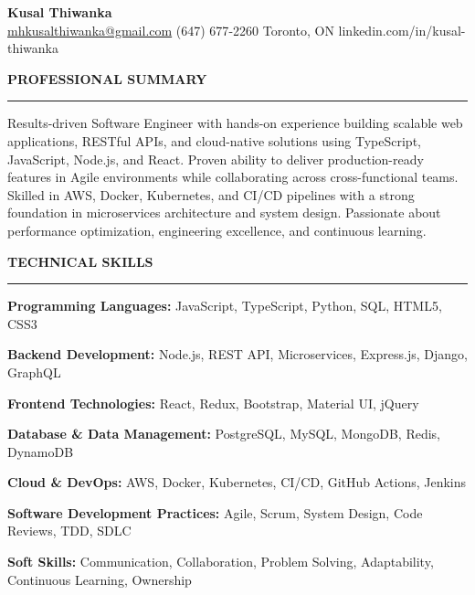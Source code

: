 \documentclass[10pt,letterpaper]{article}
\begin{document}
\begin{center}
{\LARGE\textbf{Kusal Thiwanka}}\\[3pt]
\href{mailto:mhkusalthiwanka@gmail.com}{mhkusalthiwanka@gmail.com}\hspace{2em}%
(647) 677{-}2260\hspace{2em}%
Toronto, ON\hspace{2em}
linkedin.com/in/kusal-thiwanka
\end{center}

\vspace{6pt}

\textbf{PROFESSIONAL SUMMARY}\\[-8pt]
\noindent\rule{\textwidth}{1pt}

\vspace{-2pt}

Results-driven Software Engineer with hands-on experience building scalable web applications, RESTful APIs, and cloud-native solutions using TypeScript, JavaScript, Node.js, and React. Proven ability to deliver production-ready features in Agile environments while collaborating across cross-functional teams. Skilled in AWS, Docker, Kubernetes, and CI/CD pipelines with a strong foundation in microservices architecture and system design. Passionate about performance optimization, engineering excellence, and continuous learning.

\vspace{8pt}

\textbf{TECHNICAL SKILLS}\\[-8pt]
\noindent\rule{\textwidth}{1pt}

\vspace{-2pt}

\textbf{Programming Languages:} JavaScript, TypeScript, Python, SQL, HTML5, CSS3

\textbf{Backend Development:} Node.js, REST API, Microservices, Express.js, Django, GraphQL

\textbf{Frontend Technologies:} React, Redux, Bootstrap, Material UI, jQuery

\textbf{Database \& Data Management:} PostgreSQL, MySQL, MongoDB, Redis, DynamoDB

\textbf{Cloud \& DevOps:} AWS, Docker, Kubernetes, CI/CD, GitHub Actions, Jenkins

\textbf{Software Development Practices:} Agile, Scrum, System Design, Code Reviews, TDD, SDLC

\textbf{Soft Skills:} Communication, Collaboration, Problem Solving, Adaptability, Continuous Learning, Ownership
\end{document}
